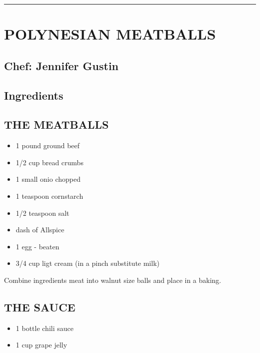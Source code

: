 \documentclass[
]{book}
\providecommand{\tightlist}{%
  \setlength{\itemsep}{0pt}\setlength{\parskip}{0pt}}
\begin{document}
\begin{center}\rule{0.5\linewidth}{0.5pt}\end{center}

\hypertarget{polynesian-meatballs}{%
\section*{POLYNESIAN MEATBALLS}\label{polynesian-meatballs}}


\hypertarget{chef-jennifer-gustin-9}{%
\subsection*{Chef: Jennifer Gustin}\label{chef-jennifer-gustin-9}}


\hypertarget{ingredients-62}{%
\subsection*{Ingredients}\label{ingredients-62}}


\hypertarget{the-meatballs}{%
\subsection*{THE MEATBALLS}\label{the-meatballs}}


\begin{itemize}
\tightlist
\item
  1 pound ground beef
\item
  1/2 cup bread crumbs
\item
  1 small onio chopped
\item
  1 teaspoon cornstarch
\item
  1/2 teaspoon salt
\item
  dash of Allspice
\item
  1 egg - beaten
\item
  3/4 cup ligt cream (in a pinch substitute milk)
\end{itemize}

Combine ingredients meat into walnut size balls and place in a baking.

\hypertarget{the-sauce-1}{%
\subsection*{THE SAUCE}\label{the-sauce-1}}


\begin{itemize}
\tightlist
\item
  1 bottle chili sauce
\item
  1 cup grape jelly
\end{itemize}
\end{document}
